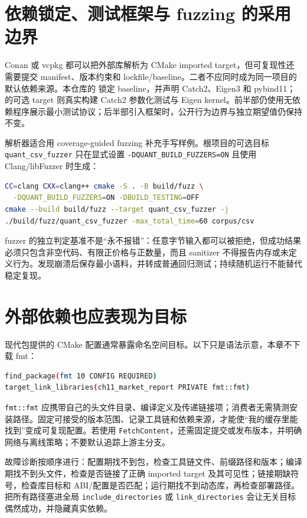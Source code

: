 \section{依赖锁定、测试框架与 fuzzing 的采用边界}

Conan 或 vcpkg 都可以把外部库解析为 CMake imported target，但可复现性还需要提交 manifest、版本约束和 lockfile/baseline。二者不应同时成为同一项目的默认依赖来源。本仓库的  锁定 baseline，并声明 Catch2、Eigen3 和 pybind11； 的可选 target 则真实构建 Catch2 参数化测试与 Eigen kernel。前半部仍使用无依赖程序展示最小测试协议；后半部引入框架时，公开行为边界与独立期望值仍保持不变。

解析器适合用 coverage-guided fuzzing 补充手写样例。根项目的可选目标 \texttt{quant\_csv\_fuzzer} 只在显式设置 \texttt{-DQUANT\_BUILD\_FUZZERS=ON} 且使用 Clang/libFuzzer 时生成：

\begin{lstlisting}[language=bash,numbers=none]
CC=clang CXX=clang++ cmake -S . -B build/fuzz \
  -DQUANT_BUILD_FUZZERS=ON -DBUILD_TESTING=OFF
cmake --build build/fuzz --target quant_csv_fuzzer -j
./build/fuzz/quant_csv_fuzzer -max_total_time=60 corpus/csv
\end{lstlisting}

fuzzer 的独立判定基准不是“永不报错”：任意字节输入都可以被拒绝，但成功结果必须只包含非空代码、有限正价格与正数量，而且 sanitizer 不得报告内存或未定义行为。发现崩溃后保存最小语料，并转成普通回归测试；持续随机运行不能替代稳定复现。

\section{外部依赖也应表现为目标}

现代包提供的 CMake 配置通常暴露命名空间目标。以下只是语法示意，本章不下载 fmt：

\begin{lstlisting}[language=bash,numbers=none]
find_package(fmt 10 CONFIG REQUIRED)
target_link_libraries(ch11_market_report PRIVATE fmt::fmt)
\end{lstlisting}

\texttt{fmt::fmt} 应携带自己的头文件目录、编译定义及传递链接项；消费者无需猜测安装路径。固定可接受的版本范围、记录工具链和依赖来源，才能使“我的缓存里能找到”变成可复现配置。若使用 \texttt{FetchContent}，还需固定提交或发布版本，并明确网络与离线策略；不要默认追踪上游主分支。

故障诊断按顺序进行：配置期找不到包，检查工具链文件、前缀路径和版本；编译期找不到头文件，检查是否链接了正确 imported target 及其可见性；链接期缺符号，检查库目标和 ABI/配置是否匹配；运行期找不到动态库，再检查部署路径。把所有路径塞进全局 \texttt{include\_directories} 或 \texttt{link\_directories} 会让无关目标偶然成功，并隐藏真实依赖。


